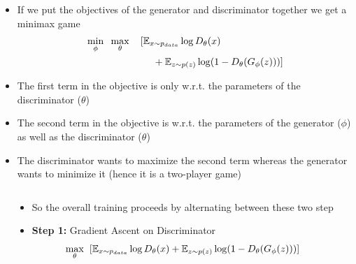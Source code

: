 {\begin{frame}
\begin{columns}
		\begin{overlayarea}{\textwidth}{\textheight}
			\begin{itemize}[<+->]\justifying
				\item<1-> If we put the objectives of the generator and discriminator together we get a minimax game
				\begin{align*}
				 \min\limits_{\phi}\hspace*{2mm} \max\limits_{\theta} \hspace*{4mm} [&\mathbb{E}_{x \sim p_{data}} \log D_{\theta}(x) \\
				 & ~~~+ \mathbb{E}_{z \sim p(z)} \log(1- D_{\theta}(G_{\phi}(z)) ) ] 
				\end{align*}
				\item<2-> The first term in the objective is only w.r.t. the parameters of the discriminator ($\theta$)

				\item<3-> The second term in the objective is w.r.t. the parameters of the generator ($\phi$) as well as the discriminator ($\theta$)
				\item<4-> The discriminator wants to maximize the second term whereas the generator wants to minimize it (hence it is a two-player game)
			\end{itemize}
		\end{overlayarea}
	\end{columns}
\end{frame}

\begin{frame}
	\begin{columns}
		\begin{overlayarea}{\textwidth}{\textheight}
			\vspace*{10mm}
			\begin{center}
						
			\end{center}		
		\end{overlayarea}

		\begin{overlayarea}{\textwidth}{\textheight}
		
			\begin{itemize}[<+->]\justifying
			\item So the overall training proceeds by alternating between these two step
			
			\item \textbf{Step 1:} Gradient Ascent on Discriminator 
				$$ \max\limits_{\theta}\hspace*{2mm} [\mathbb{E}_{x \sim p_{data}} \log D_{\theta}(x) + \mathbb{E}_{z \sim p(z)} \log(1- D_{\theta}(G_{\phi}(z)) ) ]$$


\end{itemize}
\end{overlayarea}
\end{columns}
\end{frame}}
